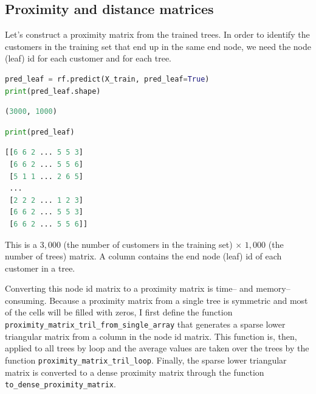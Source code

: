 \documentclass{article}
\begin{document}
\subsection{Proximity and distance matrices}

Let's construct a proximity matrix from the trained trees. In order to identify the customers in the training set that end up in the same end node, we need the node (leaf) id for each customer and for each tree. 

\begin{lstlisting}[language=Python]
pred_leaf = rf.predict(X_train, pred_leaf=True)
print(pred_leaf.shape)
\end{lstlisting}

\begin{lstlisting}[language=Python,numbers=none]
(3000, 1000)
\end{lstlisting}

\begin{lstlisting}[language=Python]
print(pred_leaf)
\end{lstlisting}

\begin{lstlisting}[language=Python,numbers=none]
[[6 6 2 ... 5 5 3]
 [6 6 2 ... 5 5 6]
 [5 1 1 ... 2 6 5]
 ...
 [2 2 2 ... 1 2 3]
 [6 6 2 ... 5 5 3]
 [6 6 2 ... 5 5 6]]
\end{lstlisting}

This is a $3,000$ (the number of customers in the training set) $\times$ $1,000$ (the number of trees) matrix. A column contains the end node (leaf) id of each customer in a tree.

Converting this node id matrix to a proximity matrix is time-- and memory--consuming. Because a proximity matrix from a single tree is symmetric and most of the cells will be filled with zeros, I first define the function \verb|proximity_matrix_tril_from_single_array| that generates a sparse lower triangular matrix from a column in the node id matrix. This function is, then, applied to all trees by loop and the average values are taken over the trees by the function \verb|proximity_matrix_tril_loop|. Finally, the sparse lower triangular matrix is converted to a dense proximity matrix through the function \verb|to_dense_proximity_matrix|.
\end{document}
